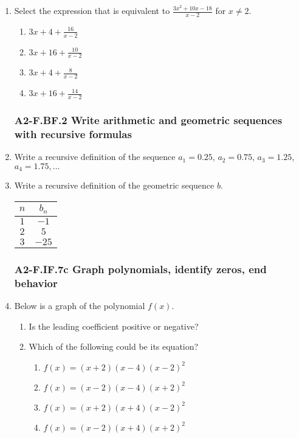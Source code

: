 \documentclass[12pt, twoside]{article}
\begin{document}
\begin{enumerate}[itemsep=0.5cm]
\item Select the expression that is equivalent to $\displaystyle \frac{3x^2 + 10x - 18}{x - 2}$ for $x \neq 2$.
    \begin{enumerate}
        \item $\displaystyle 3x + 4 + \frac{16}{x - 2}$
        \item $\displaystyle 3x + 16 + \frac{10}{x - 2}$
        \item $\displaystyle 3x + 4 + \frac{8}{x - 2}$
        \item $\displaystyle 3x + 16 + \frac{14}{x - 2}$
    \end{enumerate}
    \vspace{3cm}

\newpage
\subsubsection*{A2-F.BF.2 Write arithmetic and geometric sequences with recursive formulas}
\item Write a recursive definition of the sequence $a_1 = 0.25$, $a_2 = 0.75$, $a_3 = 1.25$, $a_4 = 1.75, \ldots$ \vspace{2cm}

\item Write a recursive definition of the geometric sequence $b$. \\[0.5cm]
\renewcommand{\arraystretch}{1.5}
\begin{tabular}{|c|c|}
\hline
$n$ & $b_n$ \\
\hline
$1$ & $-1$ \\
$2$ & $5$ \\
$3$ & $-25$ \\
\hline
\end{tabular} \vspace{1cm}

\newpage 
\subsubsection*{A2-F.IF.7c Graph polynomials, identify zeros, end behavior}
\item Below is a graph of the polynomial $f(x)$. 
\begin{multicols}{2}
    \begin{enumerate}[itemsep=1cm]
        \item Is the leading coefficient positive or negative?
        \item Which of the following could be its equation?
    \begin{enumerate}
        \item $f(x)=(x+2)(x-4)(x-2)^2$
        \item $f(x)=(x-2)(x-4)(x+2)^2$
        \item $f(x)=(x+2)(x+4)(x-2)^2$
        \item $f(x)=(x-2)(x+4)(x+2)^2$
    \end{enumerate} \vspace{1cm} \;
    \end{enumerate}


\end{multicols}
\end{enumerate}
\end{document}
